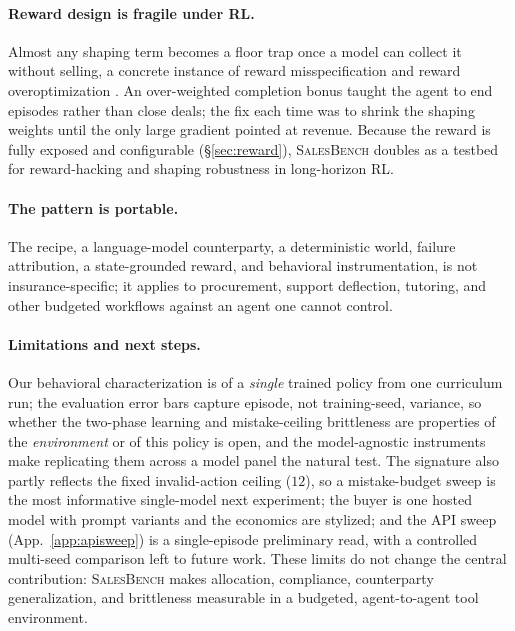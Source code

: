 \documentclass{article} %
\newcommand{\salesbench}{\textsc{SalesBench}}
\begin{document}
\paragraph{Reward design is fragile under RL.} Almost any shaping term becomes a floor trap once a model can collect
it without selling, a concrete instance of reward misspecification and reward overoptimization
\citep{pan2022reward, skalse2022reward, krakovna2020specification, gao2023scaling}. An over-weighted completion bonus taught the
agent to end episodes rather than close deals; the fix each time was to shrink the shaping weights until the only
large gradient pointed at revenue. Because the reward is fully exposed and configurable (\S\ref{sec:reward}),
\salesbench{} doubles as a testbed for reward-hacking and shaping robustness in long-horizon RL.

\paragraph{The pattern is portable.} The recipe, a language-model counterparty, a deterministic world, failure
attribution, a state-grounded reward, and behavioral instrumentation, is not insurance-specific; it applies to
procurement, support deflection, tutoring, and other budgeted workflows against an agent one cannot control.

\paragraph{Limitations and next steps.} Our behavioral characterization is of a \emph{single} trained policy from one
curriculum run; the evaluation error bars capture episode, not training-seed, variance, so whether the two-phase
learning and mistake-ceiling brittleness are properties of the \emph{environment} or of this policy is open, and the
model-agnostic instruments make replicating them across a model panel the natural test. The signature also partly
reflects the fixed invalid-action ceiling ($12$), so a mistake-budget sweep is the most informative single-model next
experiment; the buyer is one hosted model with prompt variants and the economics are stylized; and the API sweep
(App.~\ref{app:apisweep}) is a single-episode preliminary read, with a controlled multi-seed comparison left to future
work. These limits do not change the central contribution: \salesbench{} makes allocation, compliance, counterparty
generalization, and brittleness measurable in a budgeted, agent-to-agent tool environment.
\end{document}
